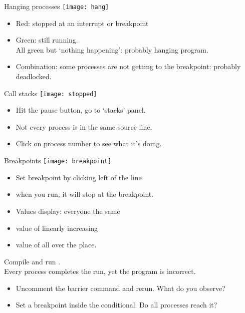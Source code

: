 \documentclass[11pt,headernav]{beamer}
\begin{document}
\begin{frame}[containsverbatim]{Hanging processes}
  \texttt{[image: hang]}
  \begin{itemize}
  \item Red: stopped at an interrupt or breakpoint
  \item Green: still running.\\
    All green but `nothing happening': probably hanging program.
  \item Combination: some processes are not getting to the breakpoint:
    probably deadlocked.
  \end{itemize}
\end{frame}

\begin{frame}[containsverbatim]{Call stacks}
  \texttt{[image: stopped]}
  \begin{itemize}
  \item Hit the pause button, go to `stacks' panel.
  \item Not every process is in the same source line.
  \item Click on process number to see what it's doing.
  \end{itemize}
\end{frame}

\begin{frame}[containsverbatim]{Breakpoints}
  \texttt{[image: breakpoint]}
  \begin{itemize}
  \item Set breakpoint by clicking left of the line
  \item when you run, it will stop at the breakpoint.
  \end{itemize}

  \begin{itemize}
  \item Values display: everyone the same 
  \item value of  linearly increasing
  \item value of  all over the place.
  \end{itemize}
\end{frame}

\begin{exerciseframe}[finalize]
  Compile and run .\\
  Every process completes the run, yet the program is incorrect.
  \begin{itemize}
  \item Uncomment the barrier command and rerun. What do you observe?
  \item Set a breakpoint inside the conditional. Do all processes reach it?
  \end{itemize}
\end{exerciseframe}
\end{document}
